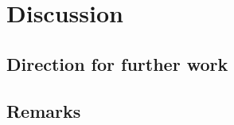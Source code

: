 
\chapter{Discussion}
\label{chapter6}

\ifpdf
\graphicspath{{Chapter6/Figs/Raster/}{Chapter6/Figs/PDF/}{Chapter6/Figs/}}
\else
\graphicspath{{Chapter6/Figs/Vector/}{Chapter6/Figs/}}
\fi


\section{Direction for further work}

\section{Remarks}








